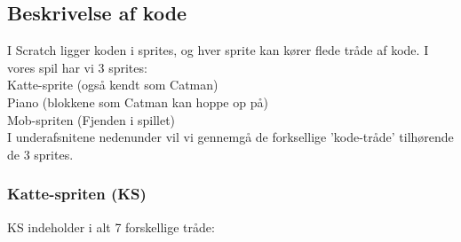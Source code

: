 \documentclass[12pt, a4paper, hidelinks]{article}
\begin{document}
\subsection{Beskrivelse af kode}

I Scratch ligger koden i sprites, og hver sprite kan kører flede tråde af kode. I vores spil har vi 3 sprites: \vspace{10mm} \\ Katte-sprite (også kendt som Catman) \\ Piano (blokkene som Catman kan hoppe op på) \\ Mob-spriten (Fjenden i spillet) \vspace{10mm}
\\ I underafsnitene nedenunder vil vi gennemgå de forksellige 'kode-tråde' tilhørende de 3 sprites.

\subsubsection{Katte-spriten (KS)}

KS indeholder i alt 7 forskellige tråde: \vspace{10mm}
\end{document}
